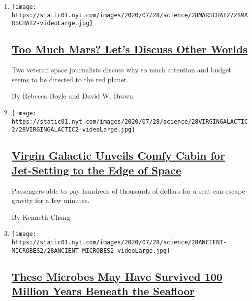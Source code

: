 \begin{enumerate}
\def\labelenumi{\arabic{enumi}.}
\item
  \texttt{[image: https://static01.nyt.com/images/2020/07/28/science/28MARSCHAT2/28MARSCHAT2-videoLarge.jpg]}

  \hypertarget{too-much-mars-lets-discuss-other-worlds}{%
  \subsection{\texorpdfstring{\href{/2020/07/28/science/mars-nasa-science.html}{Too
  Much Mars? Let's Discuss Other
  Worlds}}{Too Much Mars? Let's Discuss Other Worlds}}\label{too-much-mars-lets-discuss-other-worlds}}

  Two veteran space journalists discuss why so much attention and budget
  seems to be directed to the red planet.

  By Rebecca Boyle and David W. Brown
\item
  \texttt{[image: https://static01.nyt.com/images/2020/07/28/science/28VIRGINGALACTIC2/28VIRGINGALACTIC2-videoLarge.jpg]}

  \hypertarget{virgin-galactic-unveils-comfy-cabin-for-jet-setting-to-the-edge-of-space}{%
  \subsection{\texorpdfstring{\href{/2020/07/28/science/virgin-galactic-cabin.html}{Virgin
  Galactic Unveils Comfy Cabin for Jet-Setting to the Edge of
  Space}}{Virgin Galactic Unveils Comfy Cabin for Jet-Setting to the Edge of Space}}\label{virgin-galactic-unveils-comfy-cabin-for-jet-setting-to-the-edge-of-space}}

  Passengers able to pay hundreds of thousands of dollars for a seat can
  escape gravity for a few minutes.

  By Kenneth Chang
\item
  \texttt{[image: https://static01.nyt.com/images/2020/07/28/science/28ANCIENT-MICROBES2/28ANCIENT-MICROBES2-videoLarge.jpg]}

  \hypertarget{these-microbes-may-have-survived-100-million-years-beneath-the-seafloor}{%
  \subsection{\texorpdfstring{\href{/2020/07/28/science/microbes-100-million-years-old.html}{These
  Microbes May Have Survived 100 Million Years Beneath the
  Seafloor}}{These Microbes May Have Survived 100 Million Years Beneath the Seafloor}}\label{these-microbes-may-have-survived-100-million-years-beneath-the-seafloor}}


\end{enumerate}
